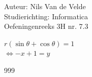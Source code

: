 \documentclass[a4paper]{article}
\begin{document}
  
\noindent \large Auteur: Nils Van de Velde \\
\noindent \large Studierichting: Informatica\\
\noindent \large Oefeningenreeks 3H nr. 7.3\\

\medskip

\normalsize

$r(\sin\theta+\cos\theta) = 1$\\

$\Leftrightarrow -x+1 = y$\\

\begin{thebibliography}{999}
\end{thebibliography}
\end{document}
